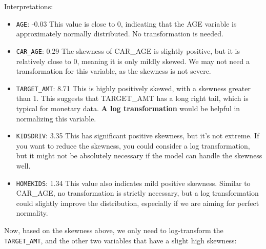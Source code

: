 \documentclass[
]{article}
\newenvironment{Shaded}{\begin{snugshade}}{\end{snugshade}}
\newcommand{\CommentTok}[1]{\textcolor[rgb]{0.56,0.35,0.01}{\textit{#1}}}
\newcommand{\DecValTok}[1]{\textcolor[rgb]{0.00,0.00,0.81}{#1}}
\newcommand{\FunctionTok}[1]{\textcolor[rgb]{0.13,0.29,0.53}{\textbf{#1}}}
\newcommand{\NormalTok}[1]{#1}
\newcommand{\OtherTok}[1]{\textcolor[rgb]{0.56,0.35,0.01}{#1}}
\newcommand{\SpecialCharTok}[1]{\textcolor[rgb]{0.81,0.36,0.00}{\textbf{#1}}}
\begin{document}
Interpretations:

\begin{itemize}
\item
  \texttt{AGE}: -0.03 This value is close to 0, indicating that the AGE
  variable is approximately normally distributed. No transformation is
  needed.
\item
  \texttt{CAR\_AGE}: 0.29 The skewness of CAR\_AGE is slightly positive,
  but it is relatively close to 0, meaning it is only mildly skewed. We
  may not need a transformation for this variable, as the skewness is
  not severe.
\item
  \texttt{TARGET\_AMT}: 8.71 This is highly positively skewed, with a
  skewness greater than 1. This suggests that TARGET\_AMT has a long
  right tail, which is typical for monetary data. \textbf{A log
  transformation} would be helpful in normalizing this variable.
\item
  \texttt{KIDSDRIV}: 3.35 This has significant positive skewness, but
  it's not extreme. If you want to reduce the skewness, you could
  consider a log transformation, but it might not be absolutely
  necessary if the model can handle the skewness well.
\item
  \texttt{HOMEKIDS}: 1.34 This value also indicates mild positive
  skewness. Similar to CAR\_AGE, no transformation is strictly
  necessary, but a log transformation could slightly improve the
  distribution, especially if we are aiming for perfect normality.
\end{itemize}

Now, based on the skewness above, we only need to log-transform the
\texttt{TARGET\_AMT}, and the other two variables that have a slight
high skewness:

\begin{Shaded}
\end{Shaded}
\end{document}
